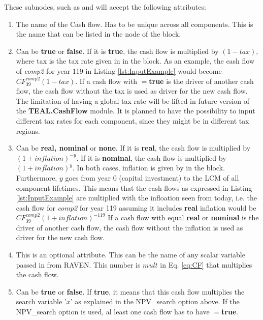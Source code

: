 \begin{enumerate}
  These subnodes, such as  and  will accept the following attributes:
  \begin{enumerate}
    \item[\xmlAttr{name}] The name of the Cash flow. Has to be unique across all components. This is the name that can be listed in the
       node of the  block.
    \item[\xmlAttr{tax}] Can be \textbf{true} or \textbf{false}. If it is \textbf{true}, the cash flow is multiplied by $(1-tax)$, where tax
      is the tax rate given in  in the 
      block. As an example, the cash flow of \textit{comp2} for year 119 in Listing \ref{lst:InputExample} would become $CF^{comp2}_{39}(1-tax)$.
      If a cash flow with $=$\textbf{true} is the driver of another cash flow, the cash flow without the tax is used as driver for the new cash flow.
      The limitation of having a global tax rate will be lifted in future version of the \textbf{TEAL.CashFlow} module. It is planned to have the possibility to
      input different tax rates for each component, since they might be in different tax regions.
    \item[\xmlAttr{inflation}] Can be \textbf{real, nominal} or \textbf{none}. If it is \textbf{real}, the cash flow is multiplied by
      $(1+inflation)^{-y}$. If it is \textbf{nominal}, the cash flow is multiplied by $(1+inflation)^y$.
      In both cases, inflation is given by  in the  block. Furthermore, $y$ goes from year 0 (capital investment)
      to the LCM of all component lifetimes.
      This means that the cash flows as expressed in Listing \ref{lst:InputExample} are multiplied with the infloation seen from today, i.e. the cash
      flow for \textit{comp2} for year 119 assuming it includes \textbf{real}
      inflation would be $CF^{comp2}_{39}(1+inflation)^{-119}$
      If a cash flow with  equal \textbf{real} or \textbf{nominal} is the driver of another cash flow, the cash flow without
      the inflation is used as driver for the new cash flow.
    \item[\xmlAttr{multiply}] This is an optional attribute. This can be the name of any scalar variable passed in from RAVEN. This number
      is $mult$ in Eq. \ref{eq:CF} that multiplies the cash flow.
    \item[\xmlAttr{mult\_target}] Can be \textbf{true} or \textbf{false}. If \textbf{true}, it means that this cash flow multiplies
      the search variable '$x$' as explained in the NPV\_search option above.
      If the NPV\_search option is used, al least one cash flow has to have $=$\textbf{true}.
  \end{enumerate}




\end{enumerate}

